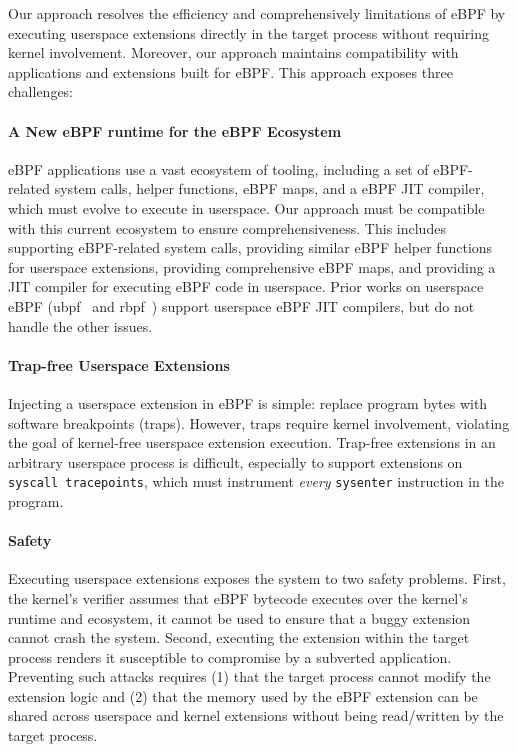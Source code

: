 Our approach resolves the efficiency and comprehensively limitations of eBPF by executing userspace extensions directly in the target process without requiring kernel involvement.  Moreover, our approach maintains compatibility with applications and extensions built for eBPF.  This approach exposes three challenges: 

\paragraph{A New eBPF runtime for the eBPF Ecosystem} eBPF applications use a vast ecosystem of tooling, including a set of eBPF-related system calls, helper functions, eBPF maps, and a eBPF JIT compiler, which must evolve to execute in userspace.  Our approach must be compatible with this current ecosystem to ensure comprehensiveness.  This includes supporting eBPF-related system calls, providing similar eBPF helper functions for userspace extensions, providing comprehensive eBPF maps, and providing a JIT compiler for executing eBPF code in userspace.  Prior works on userspace eBPF (ubpf~\cite{ubpf} and rbpf~\cite{rbpf}) support userspace eBPF JIT compilers, but do not handle the other issues. 

\paragraph{Trap-free Userspace Extensions} Injecting a userspace extension in eBPF is simple: replace program bytes with software breakpoints (\ie traps).  However, traps require kernel involvement, violating the goal of kernel-free userspace extension execution.  Trap-free extensions in an arbitrary userspace process is difficult, especially to support extensions on \texttt{syscall tracepoints}, which must instrument \emph{every} \texttt{sysenter} instruction in the program.  

\paragraph{Safety} Executing userspace extensions exposes the system to two safety problems.  First, the kernel's verifier assumes that eBPF bytecode executes over the kernel's runtime and ecosystem, it cannot be used to ensure that a buggy extension cannot crash the system.  Second, executing the extension within the target process renders it susceptible to compromise by a subverted application.  Preventing such attacks requires (1) that the target process cannot modify the extension logic and (2) that the memory used by the eBPF extension can be shared across userspace and kernel extensions without being read/written by the target process.


